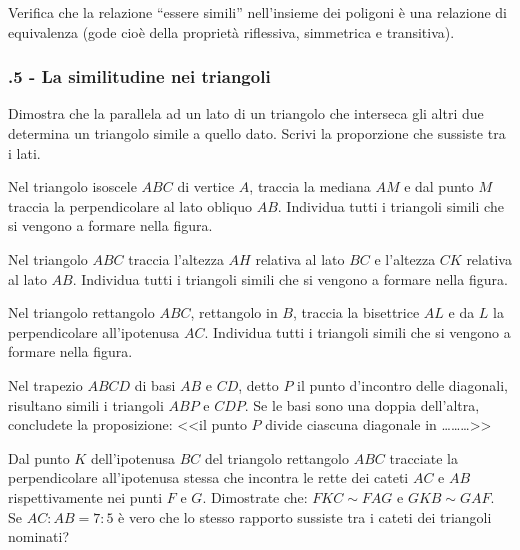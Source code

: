 \begin{multicols}{2}
\begin{esercizio}
\label{ese:6.55}
Verifica che la relazione ``essere simili'' nell'insieme dei poligoni è una relazione di equivalenza (gode cioè della proprietà riflessiva, simmetrica e transitiva).
\end{esercizio}

\subsubsection*{\thechapter.5 - La similitudine nei triangoli}

\begin{esercizio}
\label{ese:6.56}
Dimostra che la parallela ad un lato di un triangolo che interseca gli altri due determina un triangolo simile a quello dato. Scrivi la proporzione che sussiste tra i lati.
\end{esercizio}

\begin{esercizio}
\label{ese:6.57}
Nel triangolo isoscele $ABC$ di vertice $A$, traccia la mediana $AM$ e dal punto $M$ traccia la perpendicolare al lato obliquo $AB$. Individua tutti i triangoli simili che si vengono a formare nella figura.
\end{esercizio}

\begin{esercizio}
\label{ese:6.58}
Nel triangolo $ABC$ traccia l'altezza $AH$ relativa al lato $BC$ e l'altezza $CK$ relativa al lato $AB$. Individua tutti i triangoli simili che si vengono a formare nella figura.
\end{esercizio}

\begin{esercizio}
\label{ese:6.59}
Nel triangolo rettangolo $ABC$, rettangolo in $B$, traccia la bisettrice $AL$ e da $L$ la perpendicolare all'ipotenusa $AC$. Individua tutti i triangoli simili che si vengono a formare nella figura.
\end{esercizio}

\begin{esercizio}
\label{ese:6.60}
Nel trapezio $ABCD$ di basi $AB$ e $CD$, detto $P$ il punto d'incontro delle diagonali, risultano simili i triangoli $ABP$ e $CDP$. Se le basi sono una doppia dell'altra, concludete la proposizione: <<il punto $P$ divide ciascuna diagonale in \ldots\ldots\ldots{}>>
\end{esercizio}

\begin{esercizio}
\label{ese:6.61}
Dal punto $K$ dell'ipotenusa $BC$ del triangolo rettangolo $ABC$ tracciate la perpendicolare all'ipotenusa stessa che incontra le rette dei cateti $AC$ e $AB$ rispettivamente nei punti $F$ e $G$. Dimostrate che: $FKC\sim FAG$ e $GKB\sim GAF$. Se $AC:AB=7:5$ è vero che lo stesso rapporto sussiste tra i cateti dei triangoli nominati?
\end{esercizio}


\end{multicols}
